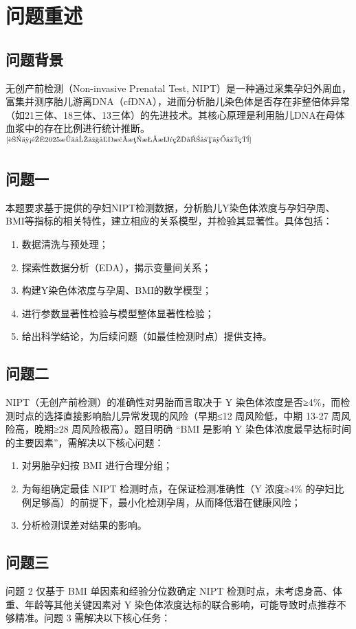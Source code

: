 \documentclass[withoutpreface,bwprint]{cumcmthesis} %
\begin{document}
\section{问题重述}
\subsection{问题背景}
无创产前检测（Non-invasive Prenatal Test, NIPT）是一种通过采集孕妇外周血，富集并测序胎儿游离DNA（cfDNA），进而分析胎儿染色体是否存在非整倍体异常（如21三体、18三体、13三体）的先进技术。其核心原理是利用胎儿DNA在母体血浆中的存在比例进行统计推断。$^\text{\cite{蒋丽雅2025无创产前检测技术的发展与应用}}$
\subsection{问题一}
本题要求基于提供的孕妇NIPT检测数据，分析胎儿Y染色体浓度与孕妇孕周、BMI等指标的相关特性，建立相应的关系模型，并检验其显著性。具体包括：
\begin{enumerate}
    \item 数据清洗与预处理；
    \item 探索性数据分析（EDA），揭示变量间关系；
    \item 构建Y染色体浓度与孕周、BMI的数学模型；
    \item 进行参数显著性检验与模型整体显著性检验；
    \item 给出科学结论，为后续问题（如最佳检测时点）提供支持。
\end{enumerate}

\subsection{问题二}
NIPT（无创产前检测）的准确性对男胎而言取决于 Y 染色体浓度是否≥4\%，而检测时点的选择直接影响胎儿异常发现的风险（早期≤12 周风险低，中期 13-27 周风险高，晚期≥28 周风险极高）。题目明确 “BMI 是影响 Y 染色体浓度最早达标时间的主要因素”，需解决以下核心问题：
\begin{enumerate}
    \item 对男胎孕妇按 BMI 进行合理分组；
    \item 为每组确定最佳 NIPT 检测时点，在保证检测准确性（Y 浓度≥4\% 的孕妇比例足够高）的前提下，最小化检测孕周，从而降低潜在健康风险；
    \item 分析检测误差对结果的影响。
\end{enumerate}


\subsection{问题三}
问题 2 仅基于 BMI 单因素和经验分位数确定 NIPT 检测时点，未考虑身高、体重、年龄等其他关键因素对 Y 染色体浓度达标的联合影响，可能导致时点推荐不够精准。问题 3 需解决以下核心任务：
\end{document}
